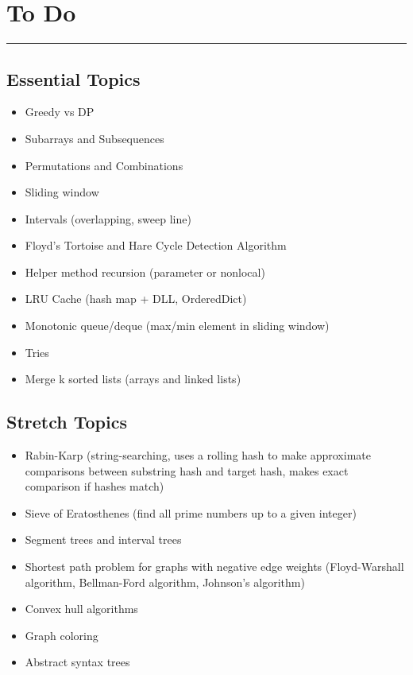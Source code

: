 \documentclass[12pt, titlepage]{article}
\begin{document}
\section{To Do}
\hrule\vspace{5ex}

\subsection{Essential Topics}
\begin{itemize}
  \item Greedy vs DP
  \item Subarrays and Subsequences
  \item Permutations and Combinations
  \item Sliding window
  \item Intervals (overlapping, sweep line)
  \item Floyd's Tortoise and Hare Cycle Detection Algorithm
  \item Helper method recursion (parameter or nonlocal)
  \item LRU Cache (hash map + DLL, OrderedDict)
  \item Monotonic queue/deque (max/min element in sliding window) %
  \item Tries
  \item Merge k sorted lists (arrays and linked lists)
\end{itemize}

\subsection{Stretch Topics}
\begin{itemize}
  \item Rabin-Karp (string-searching, uses a rolling hash to make approximate comparisons between substring hash and target hash, makes exact comparison if hashes match)
  \item Sieve of Eratosthenes (find all prime numbers up to a given integer)
  \item Segment trees and interval trees
  \item Shortest path problem for graphs with negative edge weights (Floyd-Warshall algorithm, Bellman-Ford algorithm, Johnson's algorithm)
  \item Convex hull algorithms
  \item Graph coloring
  \item Abstract syntax trees
\end{itemize}
\end{document}
